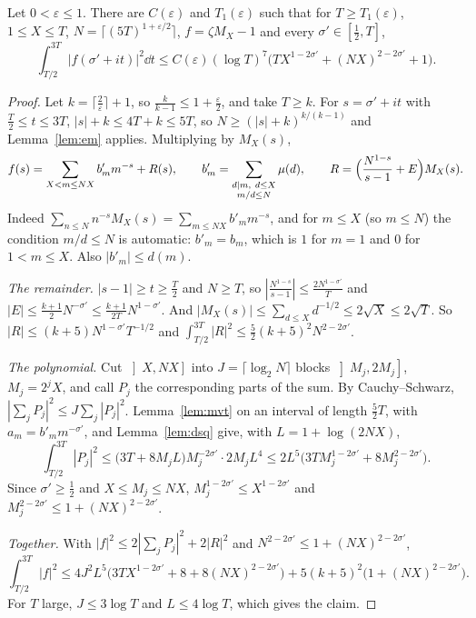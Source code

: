\begin{proposition}\label{prop:meansq}
Let $0<\varepsilon\le1$. There are $C(\varepsilon)$ and $T_1(\varepsilon)$ such that for $T\ge T_1(\varepsilon)$, $1\le X\le T$, $N=\lceil(5T)^{1+\varepsilon/2}\rceil$, $f=\zeta M_X-1$ and every $\sigma'\in[\frac12,T]$,
\[
\int_{T/2}^{3T}|f(\sigma'+it)|^2\dd t\le C(\varepsilon)(\log T)^7\bigl(TX^{1-2\sigma'}+(NX)^{2-2\sigma'}+1\bigr).
\]
\end{proposition}
\begin{proof}
Let $k=\lceil\frac2\varepsilon\rceil+1$, so $\frac k{k-1}\le1+\frac\varepsilon2$, and take $T\ge k$. For $s=\sigma'+it$ with $\frac T2\le t\le3T$, $|s|+k\le4T+k\le5T$, so $N\ge(|s|+k)^{k/(k-1)}$ and Lemma~\ref{lem:em} applies. Multiplying by $M_X(s)$,
\[
f(s)=\sum_{X<m\le NX}b'_mm^{-s}+R(s),\qquad b'_m=\sum_{\substack{d\mid m,\ d\le X\\m/d\le N}}\mu(d),\qquad R=\Bigl(\frac{N^{1-s}}{s-1}+E\Bigr)M_X(s).
\]
Indeed $\sum_{n\le N}n^{-s}M_X(s)=\sum_{m\le NX}b'_mm^{-s}$, and for $m\le X$ (so $m\le N$) the condition $m/d\le N$ is automatic: $b'_m=b_m$, which is $1$ for $m=1$ and $0$ for $1<m\le X$. Also $|b'_m|\le d(m)$.

\emph{The remainder.} $|s-1|\ge t\ge\frac T2$ and $N\ge T$, so $|\frac{N^{1-s}}{s-1}|\le\frac{2N^{1-\sigma'}}T$ and $|E|\le\frac{k+1}2N^{-\sigma'}\le\frac{k+1}{2T}N^{1-\sigma'}$. And $|M_X(s)|\le\sum_{d\le X}d^{-1/2}\le2\sqrt X\le2\sqrt T$. So $|R|\le(k+5)N^{1-\sigma'}T^{-1/2}$ and $\int_{T/2}^{3T}|R|^2\le\frac52(k+5)^2N^{2-2\sigma'}$.

\emph{The polynomial.} Cut $\left]X,NX\right]$ into $J=\lceil\log_2N\rceil$ blocks $\left]M_j,2M_j\right]$, $M_j=2^jX$, and call $P_j$ the corresponding parts of the sum. By Cauchy--Schwarz, $|\sum_jP_j|^2\le J\sum_j|P_j|^2$. Lemma~\ref{lem:mvt} on an interval of length $\frac52T$, with $a_m=b'_mm^{-\sigma'}$, and Lemma~\ref{lem:dsq} give, with $L=1+\log(2NX)$,
\[
\int_{T/2}^{3T}|P_j|^2\le\bigl(3T+8M_jL\bigr)M_j^{-2\sigma'}\cdot2M_jL^4\le2L^5\bigl(3TM_j^{1-2\sigma'}+8M_j^{2-2\sigma'}\bigr).
\]
Since $\sigma'\ge\frac12$ and $X\le M_j\le NX$, $M_j^{1-2\sigma'}\le X^{1-2\sigma'}$ and $M_j^{2-2\sigma'}\le1+(NX)^{2-2\sigma'}$.

\emph{Together.} With $|f|^2\le2|\sum_jP_j|^2+2|R|^2$ and $N^{2-2\sigma'}\le1+(NX)^{2-2\sigma'}$,
\[
\int_{T/2}^{3T}|f|^2\le4J^2L^5\bigl(3TX^{1-2\sigma'}+8+8(NX)^{2-2\sigma'}\bigr)+5(k+5)^2\bigl(1+(NX)^{2-2\sigma'}\bigr).
\]
For $T$ large, $J\le3\log T$ and $L\le4\log T$, which gives the claim.
\end{proof}


